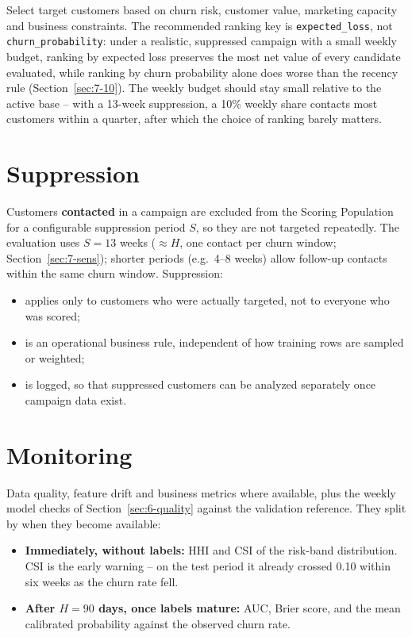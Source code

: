 Select target customers based on churn risk, customer value, marketing capacity and business constraints. The recommended ranking key is \texttt{expected\_loss}, not \texttt{churn\_probability}: under a realistic, suppressed campaign with a small weekly budget, ranking by expected loss preserves the most net value of every candidate evaluated, while ranking by churn probability alone does worse than the recency rule (Section~\ref{sec:7-10}). The weekly budget should stay small relative to the active base -- with a 13-week suppression, a 10\% weekly share contacts most customers within a quarter, after which the choice of ranking barely matters.

\section{Suppression}
\label{sec:8-5}

Customers \textbf{contacted} in a campaign are excluded from the Scoring Population for a configurable suppression period $S$, so they are not targeted repeatedly. The evaluation uses $S = 13$ weeks ($\approx H$, one contact per churn window; Section~\ref{sec:7-sens}); shorter periods (e.g.\ 4--8 weeks) allow follow-up contacts within the same churn window. Suppression:

\begin{itemize}
    \item applies only to customers who were actually targeted, not to everyone who was scored;
    \item is an operational business rule, independent of how training rows are sampled or weighted;
    \item is logged, so that suppressed customers can be analyzed separately once campaign data exist.
\end{itemize}

\section{Monitoring}
\label{sec:8-6}

Data quality, feature drift and business metrics where available, plus the weekly model checks of Section~\ref{sec:6-quality} against the validation reference. They split by when they become available:

\begin{itemize}
    \item \textbf{Immediately, without labels:} HHI and CSI of the risk-band distribution. CSI is the early warning -- on the test period it already crossed 0.10 within six weeks as the churn rate fell.
    \item \textbf{After $H = 90$ days, once labels mature:} AUC, Brier score, and the mean calibrated probability against the observed churn rate.
\end{itemize}

